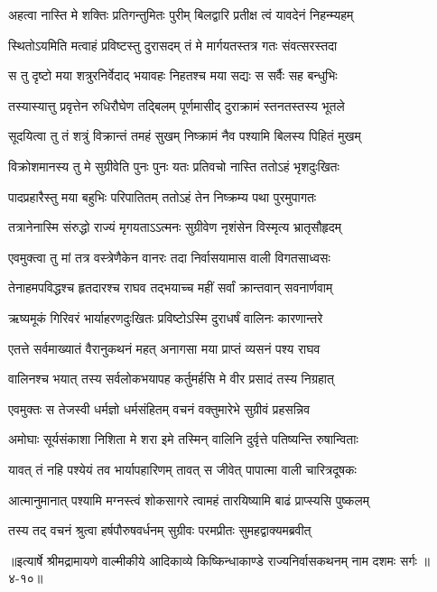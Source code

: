 \twolineshloka
{अहत्वा नास्ति मे शक्तिः प्रतिगन्तुमितः पुरीम्}
{बिलद्वारि प्रतीक्ष त्वं यावदेनं निहन्म्यहम्} %

\twolineshloka
{स्थितोऽयमिति मत्वाहं प्रविष्टस्तु दुरासदम्}
{तं मे मार्गयतस्तत्र गतः संवत्सरस्तदा} %

\twolineshloka
{स तु दृष्टो मया शत्रुरनिर्वेदाद् भयावहः}
{निहतश्च मया सद्यः स सर्वैः सह बन्धुभिः} %

\twolineshloka
{तस्यास्यात्तु प्रवृत्तेन रुधिरौघेण तद्बिलम्}
{पूर्णमासीद् दुराक्रामं स्तनतस्तस्य भूतले} %

\twolineshloka
{सूदयित्वा तु तं शत्रुं विक्रान्तं तमहं सुखम्}
{निष्क्रामं नैव पश्यामि बिलस्य पिहितं मुखम्} %

\twolineshloka
{विक्रोशमानस्य तु मे सुग्रीवेति पुनः पुनः}
{यतः प्रतिवचो नास्ति ततोऽहं भृशदुःखितः} %

\twolineshloka
{पादप्रहारैस्तु मया बहुभिः परिपातितम्}
{ततोऽहं तेन निष्क्रम्य पथा पुरमुपागतः} %

\twolineshloka
{तत्रानेनास्मि संरुद्धो राज्यं मृगयताऽऽत्मनः}
{सुग्रीवेण नृशंसेन विस्मृत्य भ्रातृसौहृदम्} %

\twolineshloka
{एवमुक्त्वा तु मां तत्र वस्त्रेणैकेन वानरः}
{तदा निर्वासयामास वाली विगतसाध्वसः} %

\twolineshloka
{तेनाहमपविद्धश्च हृतदारश्च राघव}
{तद्भयाच्च महीं सर्वां क्रान्तवान् सवनार्णवाम्} %

\twolineshloka
{ऋष्यमूकं गिरिवरं भार्याहरणदुःखितः}
{प्रविष्टोऽस्मि दुराधर्षं वालिनः कारणान्तरे} %

\twolineshloka
{एतत्ते सर्वमाख्यातं वैरानुकथनं महत्}
{अनागसा मया प्राप्तं व्यसनं पश्य राघव} %

\twolineshloka
{वालिनश्च भयात् तस्य सर्वलोकभयापह}
{कर्तुमर्हसि मे वीर प्रसादं तस्य निग्रहात्} %

\twolineshloka
{एवमुक्तः स तेजस्वी धर्मज्ञो धर्मसंहितम्}
{वचनं वक्तुमारेभे सुग्रीवं प्रहसन्निव} %

\twolineshloka
{अमोघाः सूर्यसंकाशा निशिता मे शरा इमे}
{तस्मिन् वालिनि दुर्वृत्ते पतिष्यन्ति रुषान्विताः} %

\twolineshloka
{यावत् तं नहि पश्येयं तव भार्यापहारिणम्}
{तावत् स जीवेत् पापात्मा वाली चारित्रदूषकः} %

\twolineshloka
{आत्मानुमानात् पश्यामि मग्नस्त्वं शोकसागरे}
{त्वामहं तारयिष्यामि बाढं प्राप्स्यसि पुष्कलम्} %

\twolineshloka
{तस्य तद् वचनं श्रुत्वा हर्षपौरुषवर्धनम्}
{सुग्रीवः परमप्रीतः सुमहद्वाक्यमब्रवीत्} %


॥इत्यार्षे श्रीमद्रामायणे वाल्मीकीये आदिकाव्ये किष्किन्धाकाण्डे राज्यनिर्वासकथनम् नाम दशमः सर्गः ॥४-१०॥
